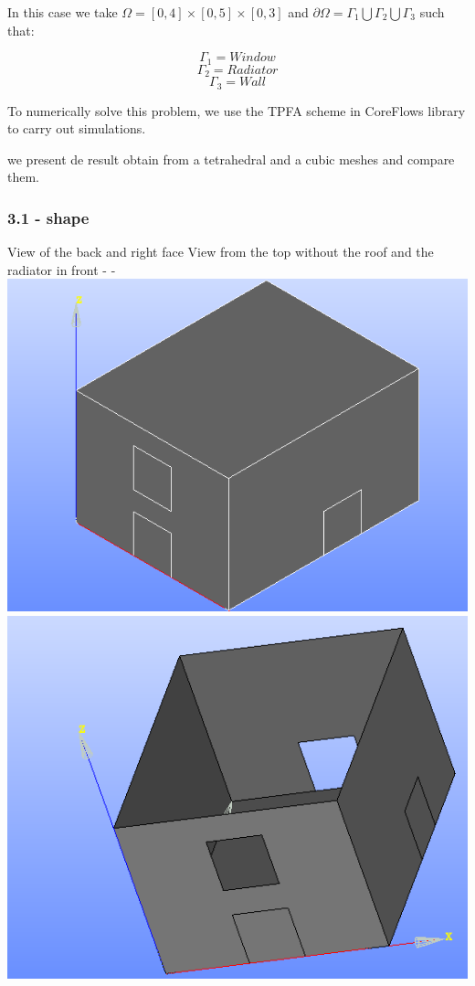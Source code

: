 \documentclass[11pt]{article}
\makeatletter
\def\maxwidth{\ifdim\Gin@nat@width>\linewidth\linewidth
    \else\Gin@nat@width\fi}
\let\Oldincludegraphics\includegraphics
\renewcommand{\includegraphics}[1]{\Oldincludegraphics[width=.8\maxwidth]{#1}}
\makeatother
\begin{document}
In this case we take \(\Omega =[0,4]\times[0,5]\times[0,3]\) and
\(\partial \Omega = \Gamma_1 \bigcup \Gamma_2\bigcup \Gamma_3\) such
that:

\[\Gamma_1 = Window\] \[\Gamma_2 = Radiator\] \[\Gamma_3 = Wall\]

To numerically solve this problem, we use the TPFA scheme in CoreFlows
library to carry out simulations.

we present de result obtain from a tetrahedral and a cubic meshes and
compare them.

    \hypertarget{shape}{%
\subsubsection{3.1 - shape}\label{shape}}

View of the back and right face\textbar{} View from the top without the
roof and the radiator in front -\textbar{} -
\includegraphics{SHView1.png}\textbar{} \includegraphics{SHNew2.png}
\end{document}
